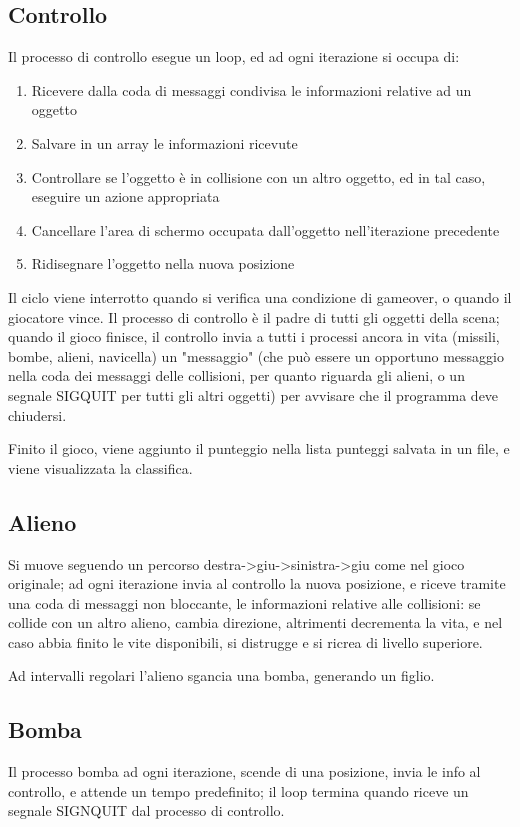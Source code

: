 \documentclass[a4paper,11pt]{report}
\begin{document}
\subsection{Controllo}
Il processo di controllo esegue un loop, ed ad ogni iterazione si occupa di:
\begin{enumerate}
  \item Ricevere dalla coda di messaggi condivisa le informazioni relative ad un oggetto
  \item Salvare in un array le informazioni ricevute
  \item Controllare se l'oggetto è in collisione con un altro oggetto, ed in tal caso, eseguire un azione appropriata
  \item Cancellare l'area di schermo occupata dall'oggetto nell'iterazione precedente
  \item Ridisegnare l'oggetto nella nuova posizione
\end{enumerate}
Il ciclo viene interrotto quando si verifica una condizione di gameover, o quando il giocatore vince.
Il processo di controllo è il padre di tutti gli oggetti della scena; quando il gioco finisce, il controllo
invia a tutti i processi ancora in vita (missili, bombe, alieni, navicella) un "messaggio" (che può essere
un opportuno messaggio nella coda dei messaggi delle collisioni, per quanto riguarda gli alieni, o un segnale SIGQUIT per
tutti gli altri oggetti) per avvisare che il programma deve chiudersi.

Finito il gioco, viene aggiunto il punteggio nella lista punteggi salvata in un file, e viene visualizzata
la classifica.

\subsection{Alieno}
Si muove seguendo un percorso destra->giu->sinistra->giu come nel gioco originale;
ad ogni iterazione invia al controllo la nuova posizione, e riceve
tramite una coda di messaggi non bloccante, le informazioni relative alle collisioni:
se collide con un altro alieno, cambia direzione, altrimenti decrementa
la vita, e nel caso abbia finito le vite disponibili, si distrugge e si ricrea di livello superiore.

Ad intervalli regolari l'alieno sgancia una bomba, generando un figlio.

\subsection{Bomba}
Il processo bomba ad ogni iterazione, scende di una posizione, invia le info al controllo, e attende
un tempo predefinito; il loop termina quando riceve un segnale SIGNQUIT dal processo di controllo.
\end{document}
